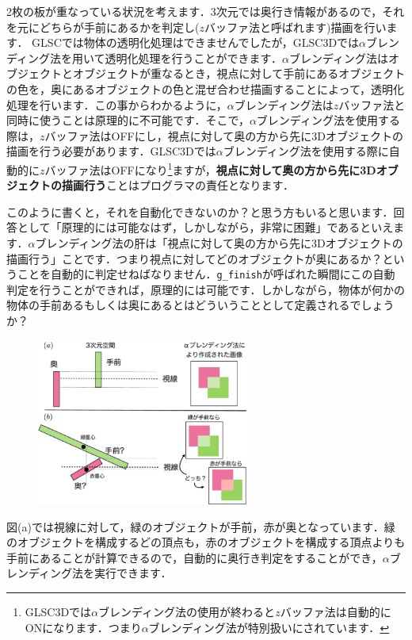 \documentclass[a4paper,12pt]{jsarticle}%
\begin{document}
2枚の板が重なっている状況を考えます．3次元では奥行き情報があるので，それを元にどちらが手前にあるかを判定し($z$バッファ法と呼ばれます)描画を行います．
GLSCでは物体の透明化処理はできませんでしたが，GLSC3Dでは$\alpha$ブレンディング法を用いて透明化処理を行うことができます．$\alpha$ブレンディング法はオブジェクトとオブジェクトが重なるとき，視点に対して手前にあるオブジェクトの色を，奥にあるオブジェクトの色と混ぜ合わせ描画することによって，透明化処理を行います．この事からわかるように，$\alpha$ブレンディング法は$z$バッファ法と同時に使うことは原理的に不可能です．そこで，$\alpha$ブレンディング法を使用する際は，$z$バッファ法はOFFにし，視点に対して奥の方から先に3Dオブジェクトの描画を行う必要があります．GLSC3Dでは$\alpha$ブレンディング法を使用する際に自動的に$z$バッファ法はOFFになり\footnote{GLSC3Dでは$\alpha$ブレンディング法の使用が終わると$z$バッファ法は自動的にONになります．つまり$\alpha$ブレンディング法が特別扱いにされています．}ますが，{\bf 視点に対して奥の方から先に3Dオブジェクトの描画行う}ことはプログラマの責任となります．

このように書くと，それを自動化できないのか？と思う方もいると思います．回答として「原理的には可能なはず，しかしながら，非常に困難」であるといえます．$\alpha$ブレンディング法の肝は「視点に対して奥の方から先に3Dオブジェクトの描画行う」ことです．つまり視点に対してどのオブジェクトが奥にあるか？ということを自動的に判定せねばなりません．\verb|g_finish|が呼ばれた瞬間にこの自動判定を行うことができれば，原理的には可能です．しかしながら，物体が何かの物体の手前あるもしくは奥にあるとはどういうこととして定義されるでしょうか？

\begin{figure}
\vspace{-1\baselineskip}
	\includegraphics[width=70mm]{./Figures/eps/005.eps}
\end{figure}

図(a)では視線に対して，緑のオブジェクトが手前，赤が奥となっています．緑のオブジェクトを構成するどの頂点も，赤のオブジェクトを構成する頂点よりも手前にあることが計算できるので，自動的に奥行き判定をすることができ，$\alpha$ブレンディング法を実行できます．
\end{document}
